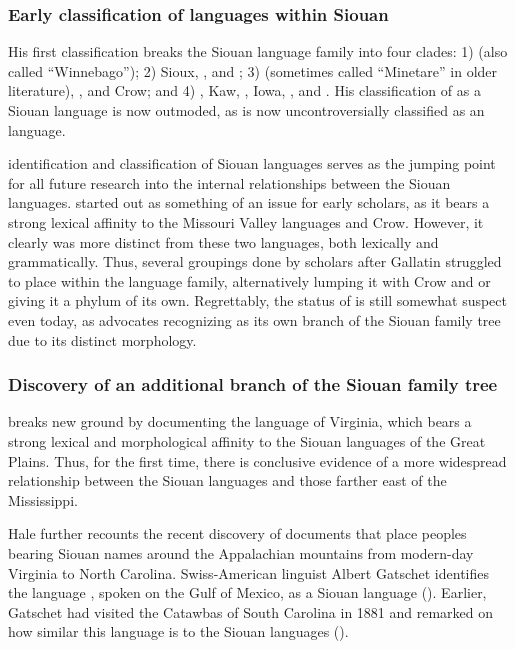 \documentclass[output=paper]{LSP/langsci}
\begin{document}
\subsubsection{Early classification of languages within Siouan}

His first classification breaks the Siouan language family into four clades: 1)  (also called ``Winnebago''); 2) Sioux, , and ; 3)  (sometimes called ``Minetare'' in older literature), , and Crow; and 4) , Kaw, , Iowa, , and  \citep{ParksRankin2001}. His classification of  as a Siouan language is now outmoded, as  is now uncontroversially classified as an  language.

 identification and classification of Siouan languages serves as the jumping point for all future research into the internal relationships between the Siouan languages.  started out as something of an issue for early scholars, as it bears a strong lexical affinity to the Missouri Valley languages  and Crow. However, it clearly was more distinct from these two languages, both lexically and grammatically. Thus, several groupings done by scholars after Gallatin struggled to place  within the language family, alternatively lumping it with Crow and  or giving it a phylum of its own. Regrettably, the status of  is still somewhat suspect even today, as \citet{Rankin2010} advocates recognizing  as its own branch of the Siouan family tree due to its distinct morphology.

\subsubsection{Discovery of an additional branch of the Siouan family tree} \citet{Hale1883} breaks new ground by documenting the  language of Virginia, which bears a strong lexical and morphological affinity to the Siouan languages of the Great Plains. Thus, for the first time, there is conclusive evidence of a more widespread relationship between the Siouan languages and those farther east of the Mississippi. 

Hale further recounts the recent discovery of documents that place peoples bearing Siouan names around the Appalachian mountains from modern-day Virginia to North Carolina. Swiss-American linguist Albert Gatschet identifies the language , spoken on the Gulf of Mexico, as a Siouan language (\citealt{Dorsey1893}). Earlier, Gatschet had visited the Catawbas of South Carolina in 1881 and remarked on how similar this language is to the Siouan languages (\citealt{Gatschet1900}). 
\end{document}
